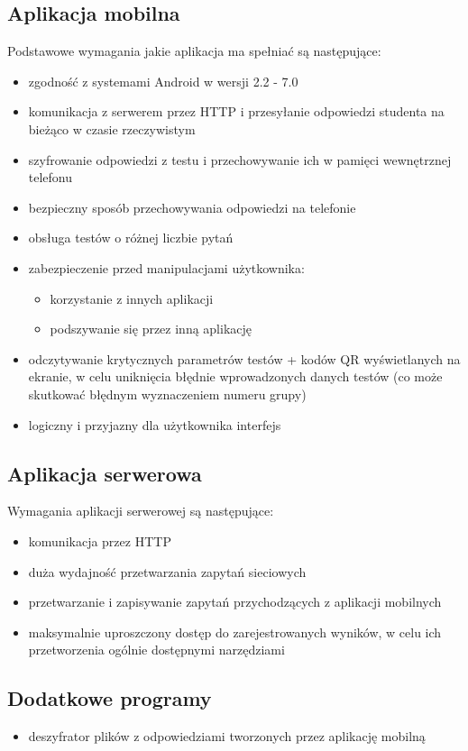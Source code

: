 \documentclass[eng]{mgr}
\begin{document}
			\subsection{Aplikacja mobilna}
			Podstawowe wymagania jakie aplikacja ma spełniać są następujące:
			\begin{itemize}
				\item zgodność z systemami Android w wersji 2.2 - 7.0
				\item komunikacja z serwerem przez HTTP i przesyłanie odpowiedzi studenta na bieżąco w czasie rzeczywistym
				\item szyfrowanie odpowiedzi z testu i przechowywanie ich w pamięci wewnętrznej telefonu
				\item bezpieczny sposób przechowywania odpowiedzi na telefonie
				\item obsługa testów o różnej liczbie pytań
				\item zabezpieczenie przed manipulacjami użytkownika:
				\begin{itemize}
					\item korzystanie z innych aplikacji
					\item podszywanie się przez inną aplikację
				\end{itemize} 
				\item odczytywanie krytycznych parametrów testów + kodów QR wyświetlanych na ekranie, w celu uniknięcia błędnie wprowadzonych danych testów (co może skutkować błędnym wyznaczeniem numeru grupy)
				\item logiczny i przyjazny dla użytkownika interfejs
			\end{itemize}
		
			\subsection{Aplikacja serwerowa}
			Wymagania aplikacji serwerowej są następujące:
			\begin{itemize}
				\item komunikacja przez HTTP
				\item duża wydajność przetwarzania zapytań sieciowych
				\item przetwarzanie i zapisywanie zapytań przychodzących z aplikacji mobilnych
				\item maksymalnie uproszczony dostęp do zarejestrowanych wyników, w celu ich przetworzenia ogólnie dostępnymi narzędziami
			\end{itemize}
		
			\subsection{Dodatkowe programy}
			\begin{itemize}
				\item deszyfrator plików z odpowiedziami tworzonych przez aplikację mobilną
			\end{itemize}
		
\end{document}
